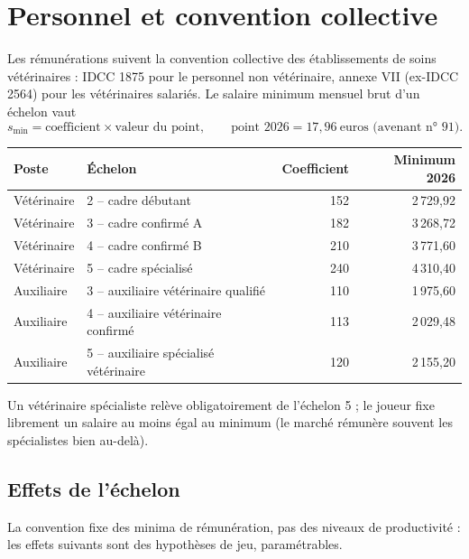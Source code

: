 \documentclass[11pt,a4paper]{article}
\begin{document}
\section{Personnel et convention collective}

Les rémunérations suivent la convention collective des établissements de
soins vétérinaires : IDCC 1875 pour le personnel non vétérinaire,
annexe VII (ex-IDCC 2564) pour les vétérinaires salariés. Le salaire
minimum mensuel brut d'un échelon vaut
\[
  s_{\min} = \text{coefficient} \times \text{valeur du point},
  \qquad \text{point 2026} = 17{,}96~\text{euros (avenant n° 91)}.
\]

\begin{center}
\begin{tabular}{@{}llrr@{}}
\toprule
Poste & Échelon & Coefficient & Minimum 2026 \\
\midrule
Vétérinaire & 2 -- cadre débutant & 152 & 2\,729,92 \\
Vétérinaire & 3 -- cadre confirmé A & 182 & 3\,268,72 \\
Vétérinaire & 4 -- cadre confirmé B & 210 & 3\,771,60 \\
Vétérinaire & 5 -- cadre spécialisé & 240 & 4\,310,40 \\
Auxiliaire & 3 -- auxiliaire vétérinaire qualifié & 110 & 1\,975,60 \\
Auxiliaire & 4 -- auxiliaire vétérinaire confirmé & 113 & 2\,029,48 \\
Auxiliaire & 5 -- auxiliaire spécialisé vétérinaire & 120 & 2\,155,20 \\
\bottomrule
\end{tabular}
\end{center}

Un vétérinaire spécialiste relève obligatoirement de l'échelon 5 ; le
joueur fixe librement un salaire au moins égal au minimum (le marché
rémunère souvent les spécialistes bien au-delà).

\subsection{Effets de l'échelon}

La convention fixe des minima de rémunération, pas des niveaux de
productivité : les effets suivants sont des hypothèses de jeu,
paramétrables.
\end{document}
